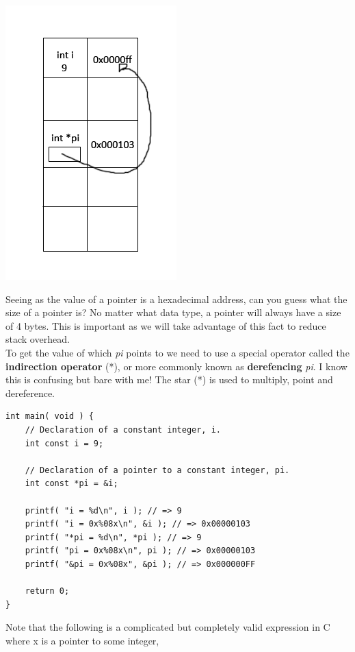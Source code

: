 \documentclass[12pt,extarticle]{article}
\begin{document}
\begin{center}
\includegraphics[scale=0.35]{pointer_example.png}
\end{center}

Seeing as the value of a pointer is a hexadecimal address, can you guess what the size of a pointer is? No matter what data type, a pointer will always have a size of 4 bytes. This is important as we will take advantage of this fact to reduce stack overhead.\\

To get the value of which \textit{pi} points to we need to use a special operator called the \textbf{indirection operator} (*), or more commonly known as \textbf{derefencing} \textit{pi}. I know this is confusing but bare with me! The star (*) is used to multiply, point and dereference.\\

\lstset {
	language=c
}
\begin{lstlisting}
int main( void ) {
	// Declaration of a constant integer, i.
	int const i = 9;

	// Declaration of a pointer to a constant integer, pi.
	int const *pi = &i;

	printf( "i = %d\n", i ); // => 9
	printf( "i = 0x%08x\n", &i ); // => 0x00000103
	printf( "*pi = %d\n", *pi ); // => 9
	printf( "pi = 0x%08x\n", pi ); // => 0x00000103
	printf( "&pi = 0x%08x", &pi ); // => 0x000000FF
	
	return 0;
}
\end{lstlisting}

Note that the following is a complicated but completely valid expression in C where x is a pointer to some integer,\\
\end{document}
